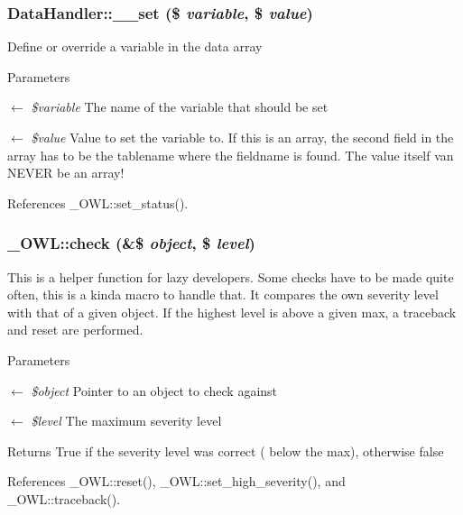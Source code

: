 \subsubsection[{\_\-\_\-set}]{\setlength{\rightskip}{0pt plus 5cm}DataHandler::\_\-\_\-set (\$ {\em variable}, \/  \$ {\em value})}\label{classDataHandler_a16c81c9564a7feaf530ce5d51ed99df7}
Define or override a variable in the data array


\begin{DoxyParams}{Parameters}
\item[\mbox{$\leftarrow$} {\em \$variable}]The name of the variable that should be set \item[\mbox{$\leftarrow$} {\em \$value}]Value to set the variable to. If this is an array, the second field in the array has to be the tablename where the fieldname is found. The value itself van NEVER be an array! \end{DoxyParams}


References \_\-OWL::set\_\-status().

\subsubsection[{check}]{\setlength{\rightskip}{0pt plus 5cm}\_\-OWL::check (\&\$ {\em object}, \/  \$ {\em level})}\label{class__OWL_ad6f4f6946f40199dd0333cf219fa500e}
This is a helper function for lazy developers. Some checks have to be made quite often, this is a kinda macro to handle that. It compares the own severity level with that of a given object. If the highest level is above a given max, a traceback and reset are performed.


\begin{DoxyParams}{Parameters}
\item[\mbox{$\leftarrow$} {\em \$object}]Pointer to an object to check against \item[\mbox{$\leftarrow$} {\em \$level}]The maximum severity level \end{DoxyParams}
\begin{DoxyReturn}{Returns}
True if the severity level was correct ( below the max), otherwise false 
\end{DoxyReturn}


References \_\-OWL::reset(), \_\-OWL::set\_\-high\_\-severity(), and \_\-OWL::traceback().



